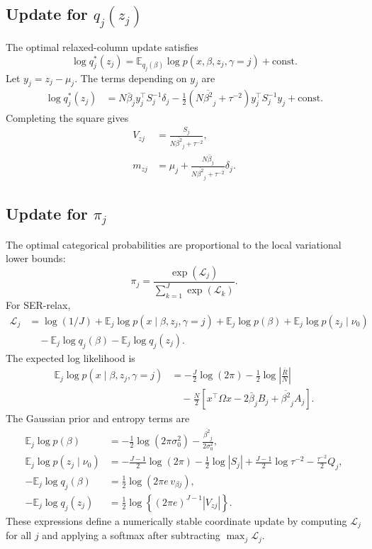 \documentclass[11pt]{article}
\newcommand{\Rbar}{\bar R}
\newcommand{\Om}{\Omega}
\newcommand{\E}{\mathbb E}
\begin{document}
\subsection{Update for \texorpdfstring{\(q_j(z_j)\)}{qj(zj)}}

The optimal relaxed-column update satisfies
\[
\log q_j^*(z_j)
=
\E_{q_j(\beta)}\log p(x,\beta,z_j,\gamma=j)+\mathrm{const}.
\]
Let \(y_j=z_j-\mu_j\). The terms depending on \(y_j\) are
\begin{align}
\log q_j^*(z_j)
&=
N\bar\beta_j y_j^\top S_j^{-1}\delta_j
-\frac12
\left(N\overline{\beta^2}_j+\tau^{-2}\right)
y_j^\top S_j^{-1}y_j
+\mathrm{const}.
\end{align}
Completing the square gives
\begin{align}
V_{zj}
&=
\frac{S_j}{N\overline{\beta^2}_j+\tau^{-2}},\\
m_{zj}
&=
\mu_j+
\frac{N\bar\beta_j}
{N\overline{\beta^2}_j+\tau^{-2}}
\delta_j.
\end{align}

\subsection{Update for \texorpdfstring{\(\pi_j\)}{pi j}}

The optimal categorical probabilities are proportional to the local
variational lower bounds:
\[
\pi_j
=
\frac{\exp(\mathcal L_j)}
{\sum_{k=1}^J\exp(\mathcal L_k)}.
\]
For SER-relax,
\begin{align}
\mathcal L_j
&=
\log(1/J)
+\E_j\log p(x\mid\beta,z_j,\gamma=j)
+\E_j\log p(\beta)
+\E_j\log p(z_j\mid\nu_0) \nonumber\\
&\quad
-\E_j\log q_j(\beta)
-\E_j\log q_j(z_j).
\end{align}
The expected log likelihood is
\begin{align}
\E_j\log p(x\mid\beta,z_j,\gamma=j)
&=
-\frac{J}{2}\log(2\pi)
-\frac12\log\left|\frac{\Rbar}{N}\right| \nonumber\\
&\quad
-\frac{N}{2}
\left[
x^\top\Om x
-2\bar\beta_jB_j
+\overline{\beta^2}_jA_j
\right].
\end{align}
The Gaussian prior and entropy terms are
\begin{align}
\E_j\log p(\beta)
&=
-\frac12\log(2\pi\sigma_0^2)
-\frac{\overline{\beta^2}_j}{2\sigma_0^2},\\
\E_j\log p(z_j\mid\nu_0)
&=
-\frac{J-1}{2}\log(2\pi)
-\frac12\log|S_j|
+\frac{J-1}{2}\log\tau^{-2}
-\frac{\tau^{-2}}{2}Q_j,\\
-\E_j\log q_j(\beta)
&=
\frac12\log(2\pi e\,v_{\beta j}),\\
-\E_j\log q_j(z_j)
&=
\frac12\log\left\{(2\pi e)^{J-1}|V_{zj}|\right\}.
\end{align}
These expressions define a numerically stable coordinate update by
computing \(\mathcal L_j\) for all \(j\) and applying a softmax after
subtracting \(\max_j\mathcal L_j\).
\end{document}
